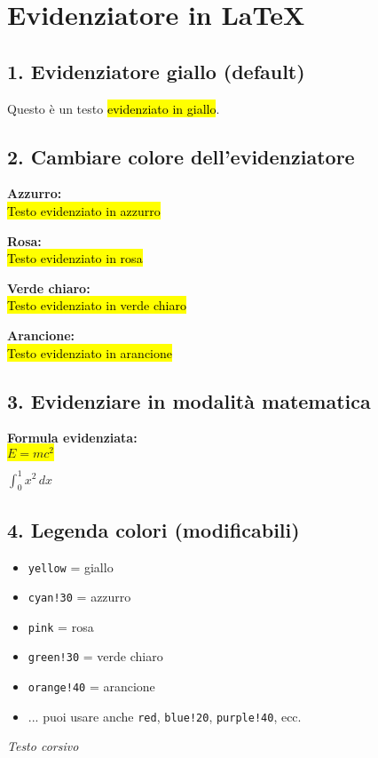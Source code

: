\section*{Evidenziatore in LaTeX}

\subsection*{1. Evidenziatore giallo (default)}
Questo è un testo \hl{evidenziato in giallo}.

\subsection*{2. Cambiare colore dell'evidenziatore}

\textbf{Azzurro:}\\
{\hl{Testo evidenziato in azzurro}}

\vspace{5pt}
\textbf{Rosa:}\\
{\hl{Testo evidenziato in rosa}}

\vspace{5pt}
\textbf{Verde chiaro:}\\
{\hl{Testo evidenziato in verde chiaro}}

\vspace{5pt}
\textbf{Arancione:}\\
{\hl{Testo evidenziato in arancione}}

\subsection*{3. Evidenziare in modalità matematica}

\textbf{Formula evidenziata:}\\
\colorbox{yellow}{$E = mc^2$}

\vspace{5pt}
\colorbox{cyan!30}{$\int_0^1 x^2\,dx$}

\subsection*{4. Legenda colori (modificabili)}

\begin{itemize}
  \item \texttt{yellow} = giallo
  \item \texttt{cyan!30} = azzurro
  \item \texttt{pink} = rosa
  \item \texttt{green!30} = verde chiaro
  \item \texttt{orange!40} = arancione
  \item ... puoi usare anche \texttt{red}, \texttt{blue!20}, \texttt{purple!40}, ecc.

  
\end{itemize}

\item \textit{Testo corsivo}
